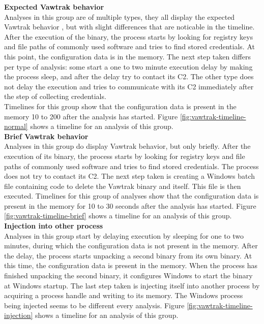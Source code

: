 \documentclass[conference]{IEEEtran}
\begin{document}
\newpage

\textbf{Expected Vawtrak behavior}
\\Analyses in this group are of multiple types, they all display the expected Vawtrak behavior \cite{kroustek-vawtrak}, but with slight differences that are noticable in the timeline. \\After the execution of the binary, the process starts by looking for registry keys and file paths of commonly used software and tries to find stored credentials. At this point, the \Gls{configuration data} is in the memory. The next step taken differs per type of analysis: some start a one to two minute execution delay by making the process sleep, and after the delay try to contact its \Gls{C2}. The other type does not delay the execution and  tries to communicate with its \Gls{C2} immediately after the step of collecting credentials.\\ Timelines for this group show that the \Gls{configuration data} is present in the memory 10 to 200 after the analysis has started. Figure \ref{fig:vawtrak-timeline-normal} shows a timeline for an analysis of this group.\\


\textbf{Brief Vawtrak behavior}
\\Analyses in this group do display Vawtrak behavior\cite{kroustek-vawtrak}, but only briefly. After the execution of its binary, the process starts by looking for registry keys and file paths of commonly used software and tries to find stored credentials. The process does not try to contact its \Gls{C2}. The next step taken is creating a Windows batch file containing code to delete the Vawtrak binary and itself. This file is then executed. Timelines for this group of analyses show that the \Gls{configuration data} is present in the memory for 10 to 30 seconds after the analysis has started. Figure \ref{fig:vawtrak-timeline-brief} shows a timeline for an analysis of this group.\\

\textbf{Injection into other process}
\\Analyses in this group start by delaying execution by \Gls{sleeping} for one to two minutes, during which the \Gls{configuration data} is not present in the memory. After the delay, the process starts unpacking a second binary from its own binary. At this time, the \Gls{configuration data} is present in the memory. When the process has finished unpacking the second binary, it configures Windows to start the binary at Windows startup. The last step taken is injecting itself into another process by acquiring a process handle and writing to its memory. The Windows process being injected seems to be different every analysis. Figure \ref{fig:vawtrak-timeline-injection} shows a timeline for an analysis of this group.\\
\end{document}
